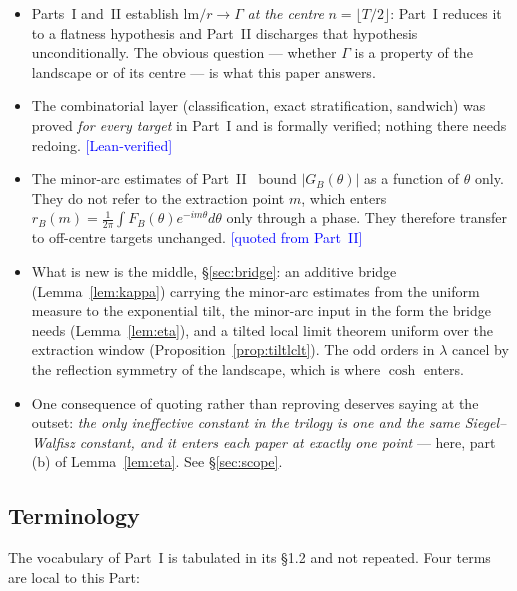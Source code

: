 \documentclass[11pt,a4paper]{article}
\theoremstyle{plain}
\theoremstyle{definition}
\theoremstyle{remark}
\newcommand{\lm}{\mathrm{lm}}
\newcommand{\STATUS}[1]{\textcolor{blue}{\textsf{[#1]}}}
\begin{document}
\begin{itemize}
\item Parts~I and~II establish $\lm/r\to\Gamma$ \emph{at the centre}
      $n=\lfloor T/2\rfloor$: Part~I reduces it to a flatness hypothesis and Part~II
      discharges that hypothesis unconditionally. The obvious question --- whether $\Gamma$ is
      a property of the landscape or of its centre --- is what this paper answers.
\item The combinatorial layer (classification, exact stratification, sandwich) was proved
      \emph{for every target} in Part~I and is formally verified; nothing there needs redoing.
      \STATUS{Lean-verified}
\item The minor-arc estimates of Part~II~\cite{P2} bound $|G_B(\theta)|$ as a function of $\theta$ only.
      They do not refer to the extraction point $m$, which enters
      $r_B(m)=\frac1{2\pi}\int F_B(\theta)e^{-im\theta}d\theta$ only through a phase. They
      therefore transfer to off-centre targets unchanged. \STATUS{quoted from Part~II}
\item What is new is the middle, \S\ref{sec:bridge}: an additive bridge
      (Lemma~\ref{lem:kappa}) carrying the minor-arc estimates from the uniform measure to the
      exponential tilt, the minor-arc input in the form the bridge needs
      (Lemma~\ref{lem:eta}), and a tilted local limit theorem uniform over the extraction
      window (Proposition~\ref{prop:tiltlclt}). The odd orders in $\lambda$ cancel by the
      reflection symmetry of the landscape, which is where $\cosh$ enters.
\item One consequence of quoting rather than reproving deserves saying at the outset: \emph{the
      only ineffective constant in the trilogy is one and the same Siegel--Walfisz constant,
      and it enters each paper at exactly one point} --- here, part (b) of
      Lemma~\ref{lem:eta}. See \S\ref{sec:scope}.
\end{itemize}

\subsection{Terminology}\label{sec:terminology4}

The vocabulary of Part~I is tabulated in its \S1.2 and not repeated. Four terms
are local to this Part:
\end{document}

